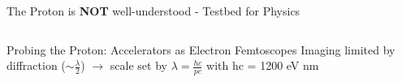 \documentclass[aspectratio=169]{beamer}
\newcommand*{\myfont}{\fontfamily{lmtt}\selectfont}
\begin{document}
\begin{frame}{The Proton is \textbf{NOT} well-understood - Testbed for Physics}
\begin{columns}
            \quad \quad \quad  {\myfont{\tiny \quad \quad \quad [Proton Puzzles, Nat Rev Phys, 2021]   }}
                
            
    \end{columns}
\end{frame}


\begin{frame}{Probing the Proton: Accelerators as Electron Femtoscopes}
Imaging limited by diffraction ($\sim \frac{\lambda}{2}$) $\rightarrow$ scale set by $\lambda = \frac{hc}{pc}$ with hc = 1200 eV nm
\end{frame}
\end{document}
